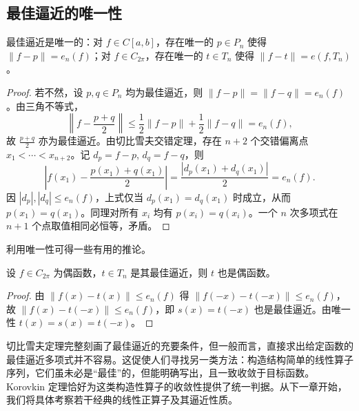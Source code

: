\subsection{最佳逼近的唯一性}
\begin{theorem}
最佳逼近是唯一的：对 $f\in C[a,b]$，存在唯一的 $p\in P_n$ 使得 $\|f-p\| = e_n(f)$；对 $f\in C_{2\pi}$，存在唯一的 $t\in T_n$ 使得 $\|f-t\| = e(f,T_n)$。
\end{theorem}

\begin{proof}
若不然，设 $p,q\in P_n$ 均为最佳逼近，则 $\|f-p\| = \|f-q\| = e_n(f)$。由三角不等式，
\[
\left\|f - \frac{p+q}{2}\right\|  \leqslant \frac12\|f-p\| + \frac12\|f-q\| = e_n(f),
\]
故 $\frac{p+q}{2}$ 亦为最佳逼近。由切比雪夫交错定理，存在 $n+2$ 个交错偏离点 $x_1<\cdots<x_{n+2}$。记 $d_p = f-p$, $d_q = f-q$，则
\[
\left|f(x_1) - \frac{p(x_1)+q(x_1)}{2}\right| = \frac{|d_p(x_1)+d_q(x_1)|}{2} = e_n(f).
\]
因 $|d_p|,|d_q| \leqslant e_n(f)$，上式仅当 $d_p(x_1)=d_q(x_1)$ 时成立，从而 $p(x_1)=q(x_1)$。同理对所有 $x_i$ 均有 $p(x_i)=q(x_i)$。一个 $n$ 次多项式在 $n+1$ 个点取值相同必恒等，矛盾。
\end{proof}

利用唯一性可得一些有用的推论。
\begin{theorem}
设 $f\in C_{2\pi}$ 为偶函数，$t\in T_n$ 是其最佳逼近，则 $t$ 也是偶函数。
\end{theorem}
\begin{proof}
由 $\|f(x)-t(x)\| \leqslant e_n(f)$ 得 $\|f(-x)-t(-x)\| \leqslant e_n(f)$，故 $\|f(x)-t(-x)\| \leqslant e_n(f)$，即 $s(x)=t(-x)$ 也是最佳逼近。由唯一性 $t(x)=s(x)=t(-x)$。
\end{proof}

切比雪夫定理完整刻画了最佳逼近的充要条件，但一般而言，直接求出给定函数的最佳逼近多项式并不容易。这促使人们寻找另一类方法：构造结构简单的线性算子序列，它们虽未必是“最佳”的，但能明确写出，且一致收敛于目标函数。 Korovkin 定理恰好为这类构造性算子的收敛性提供了统一判据。从下一章开始，我们将具体考察若干经典的线性正算子及其逼近性质。